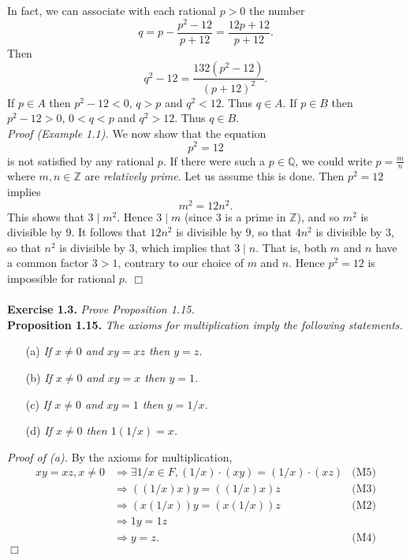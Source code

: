 \documentclass{article}
\begin{document}
In fact, we can associate with each rational $p > 0$ the number
$$q = p - \frac{p^2 - 12}{p + 12} = \frac{12p + 12}{p + 12}.$$
Then
$$q^2 - 12 = \frac{132(p^2 - 12)}{(p + 12)^2}.$$
If $p \in A$ then $p^2 - 12 < 0$, $q > p$ and $q^2 < 12$. Thus $q \in A$.
If $p \in B$ then $p^2 - 12 > 0$, $0 < q < p$ and $q^2 > 12$. Thus $q \in B$. \\

\emph{Proof (Example 1.1).}
We now show that the equation
$$p^2 = 12$$
is not satisfied by any rational $p$.
If there were such a $p \in \mathbb{Q}$,
we could write $p = \frac{m}{n}$ where $m, n \in \mathbb{Z}$ are \emph{relatively prime}.
Let us assume this is done. Then $p^2 = 12$ implies
$$m^2 = 12 n^2.$$
This shows that $3 \mid m^2$. Hence $3 \mid m$ (since $3$ is a prime in $\mathbb{Z}$),
and so $m^2$ is divisible by $9$.
It follows that $12n^2$ is divisible by $9$,
so that $4n^2$ is divisible by $3$,
so that $n^2$ is divisible by $3$,
which implies that $3 \mid n$.
That is, both $m$ and $n$ have a common factor $3 > 1$,
contrary to our choice of $m$ and $n$.
Hence $p^2 = 12$ is impossible for rational $p$.
$\Box$ \\\\






\textbf{Exercise 1.3.}
\emph{Prove Proposition 1.15.} \\

\textbf{Proposition 1.15.}
\emph{The axioms for multiplication imply the following statements.}
\begin{enumerate}
\item[(a)]
\emph{If $x \neq 0$ and $xy=xz$ then $y = z$.}
\item[(b)]
\emph{If $x \neq 0$ and $xy=x$ then $y = 1$.}
\item[(c)]
\emph{If $x \neq 0$ and $xy=1$ then $y = 1/x$.}
\item[(d)]
\emph{If $x \neq 0$ then $1(1/x) = x$.} \\
\end{enumerate}

\emph{Proof of (a).}
By the axioms for multiplication,
\begin{align*}
xy = xz, x \neq 0
&\Longrightarrow
\exists 1/x \in F, (1/x) \cdot (xy) = (1/x) \cdot (xz)
  &\text{(M5)} \\
&\Longrightarrow
((1/x)x)y = ((1/x)x)z
  &\text{(M3)} \\
&\Longrightarrow
(x(1/x))y = (x(1/x))z
  &\text{(M2)} \\
&\Longrightarrow
1y = 1z \\
&\Longrightarrow
y = z.
  &\text{(M4)}
\end{align*}
$\Box$ \\
\end{document}
